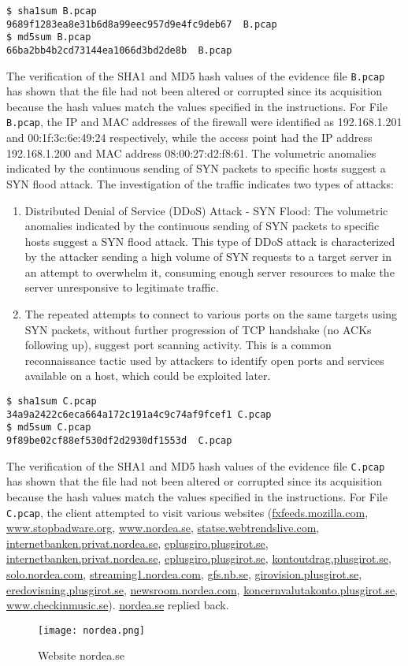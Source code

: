 \begin{verbatim}
$ sha1sum B.pcap             
9689f1283ea8e31b6d8a99eec957d9e4fc9deb67  B.pcap
$ md5sum B.pcap 
66ba2bb4b2cd73144ea1066d3bd2de8b  B.pcap
\end{verbatim}
The verification of the SHA1 and MD5 hash values of the evidence file \texttt{B.pcap} has shown that the file had not been altered or corrupted since its acquisition because the hash values match the values specified in the instructions. For File \texttt{B.pcap}, the IP and MAC addresses of the firewall were identified as 192.168.1.201 and 00:1f:3c:6e:49:24 respectively, while the access point had the IP address 192.168.1.200 and MAC address 08:00:27:d2:f8:61. The volumetric anomalies indicated by the continuous sending of SYN packets to specific hosts suggest a SYN flood attack. The investigation of the traffic indicates two types of attacks:
\begin{enumerate}
	\item Distributed Denial of Service (DDoS) Attack - SYN Flood: The volumetric anomalies indicated by the continuous sending of SYN packets to specific hosts suggest a SYN flood attack. This type of DDoS attack is characterized by the attacker sending a high volume of SYN requests to a target server in an attempt to overwhelm it, consuming enough server resources to make the server unresponsive to legitimate traffic.
	\item The repeated attempts to connect to various ports on the same targets using SYN packets, without further progression of TCP handshake (no ACKs following up), suggest port scanning activity. This is a common reconnaissance tactic used by attackers to identify open ports and services available on a host, which could be exploited later.
\end{enumerate}

\begin{verbatim}
$ sha1sum C.pcap             
34a9a2422c6eca664a172c191a4c9c74af9fcef1 C.pcap
$ md5sum C.pcap 
9f89be02cf88ef530df2d2930df1553d  C.pcap
\end{verbatim}
The verification of the SHA1 and MD5 hash values of the evidence file \texttt{C.pcap} has shown that the file had not been altered or corrupted since its acquisition because the hash values match the values specified in the instructions. For File \texttt{C.pcap}, the client attempted to visit various websites (\url{fxfeeds.mozilla.com}, \url{www.stopbadware.org}, \url{www.nordea.se}, \url{statse.webtrendslive.com}, \url{internetbanken.privat.nordea.se}, \url{eplusgiro.plusgirot.se}, \url{internetbanken.privat.nordea.se}, \url{eplusgiro.plusgirot.se}, \url{kontoutdrag.plusgirot.se}, \url{solo.nordea.com}, \url{streaming1.nordea.com}, \url{gfs.nb.se}, \url{girovision.plusgirot.se}, \url{eredovisning.plusgirot.se}, \url{newsroom.nordea.com}, \url{koncernvalutakonto.plusgirot.se}, \url{www.checkinmusic.se}). \url{nordea.se} replied back.
\begin{figure}[h]
\texttt{[image: nordea.png]}
\centering
\caption{Website nordea.se}
\label{screen:nordea}
\end{figure}

